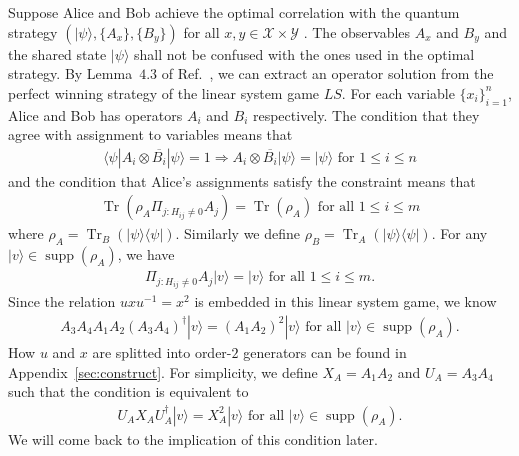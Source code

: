 \documentclass[11pt,letterpaper]{article}
\newcommand{\ket}[1]{|#1\rangle}
\newcommand{\bra}[1]{\langle#1|}
\newcommand{\ketbra}[2]{|#1\rangle\langle#2|}
\DeclareMathOperator{\Tr}{Tr}
\DeclareMathOperator{\supp}{supp}
\newcommand{\calX}{\mathcal{X}}
\newcommand{\calY}{\mathcal{Y}}
\newcommand{\1}{\mathbb{1}}
\newcommand{\LS}{LS}
\theoremstyle{definition}
\begin{document}
Suppose Alice and Bob achieve the optimal correlation with the quantum strategy $(\ket{\psi}, \{A_x\}, \{B_y\})$
for all $x,y \in \calX \times \calY$ .
The observables $A_x$ and $B_y$ and the shared state $\ket{\psi}$ shall not be confused with the ones used in the optimal strategy.
By Lemma~$4.3$ of Ref.~\cite{coladan2017}, we can extract an operator solution from the perfect winning strategy 
of the linear system game $\LS$. 
For each variable $\{ x_i \}_{i=1}^n$, Alice and Bob has operators $A_i$ and $B_i$ respectively.
The condition that they agree with assignment to variables means that 
\begin{align}
	\bra{\psi} A_i \otimes \overline{B_i} \ket{\psi} = 1 \Rightarrow A_i \otimes \overline{B_i} \ket{\psi} = \ket{\psi}
	\text{ for } 1 \leq i \leq n
\end{align}
and the condition that Alice's assignments satisfy the constraint means that 
\begin{align}
	\Tr(\rho_A \Pi_{j: H_{ij} \neq 0} A_j) = \Tr(\rho_A) \text{ for all } 1 \leq i \leq m
\end{align}
where $\rho_A =  \Tr_B(\ketbra{\psi}{\psi})$. 
Similarly we define $\rho_B = \Tr_A(\ketbra{\psi}{\psi})$.
For any $\ket{v} \in \supp(\rho_A)$,
we have 
\begin{align}
\Pi_{j:H_{ij} \neq 0} A_j \ket{v} = \ket{v} \text{ for all } 1 \leq i \leq m.
\end{align}
Since the relation $uxu^{-1} = x^2$ is embedded in this linear system game, we know
\begin{align}
	A_3A_4 A_1A_2 (A_3A_4)^\dagger \ket{v}= (A_1A_2)^2 \ket{v} \text{ for all } \ket{v} \in \supp(\rho_A).
\end{align}
How $u$ and $x$ are splitted into order-$2$ generators can be found in Appendix~\ref{sec:construct}.
For simplicity, we define $X_A = A_1A_2$ and $U_A=A_3A_4$ such that
the condition is equivalent to
\begin{align}
	\label{eq:ux_relation}
	U_AX_AU_A^\dagger \ket{v} = X_A^2 \ket{v} \text{ for all } \ket{v} \in \supp(\rho_A).
\end{align}
We will come back to the implication of this condition later.
\end{document}
